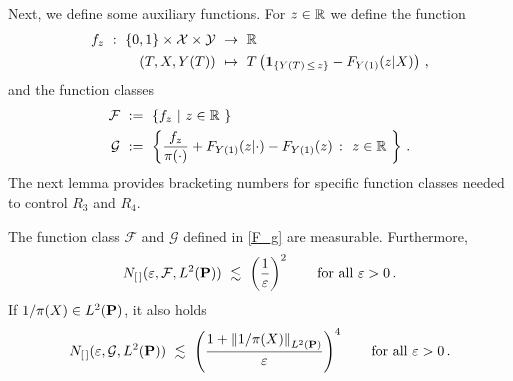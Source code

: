 Next, we define some auxiliary functions.
  For $z\in\R$ we define the function
  \begin{align*}
    f_z
    \ 
    :
    \ 
      \left\{ 0,1 \right\}
      \times
      \mathcal{X}
      \times
      \mathcal{Y}
    &
    \ 
    \to
    \ 
    \R
    \\
      (T,X,Y(T))
    &
      \ 
      \mapsto
      \ 
      T
      \left( 
        \mathbf{1}
        _{\left\{  Y(T)\,\le\,z \right\}}
        -
        F_{Y(1)}(z|X)
      \right)
      \,,
  \end{align*}
  and the function classes
  \begin{gather}
    \label{F_g}
    \begin{split}
    \mathcal{F}
    &
    \ 
    :=
    \ 
    \left\{ 
      f_z
      \ 
      |
      \ 
      z\in\R\ 
    \right\}
    \\
    \mathcal{G}
    &
    \ 
    :=
    \ 
    \left\{ 
      \frac{f_z}{\pi(\cdot)}
      +
      F_{Y(1)}(z|\cdot)
      -
      F_{Y(1)}(z)
      \ 
      \colon
      \ 
      z\in\R\ 
    \right\}
    \,.
    \end{split}
  \end{gather}
The next lemma provides bracketing numbers for specific function classes needed to control $R_3$ and $R_4$.
\newpage
\begin{lemma}
  The function class $\mathcal{F}$ and $\mathcal{G}$ defined in \eqref{F_g} are measurable.
  Furthermore, 
  \begin{gather*}
    N_{[\,]}
    (
    \varepsilon
    ,
    \mathcal{F}, L^2(\P))
    \ 
    \lesssim
    \ 
    \left( 
      \frac{1}{\varepsilon}
    \right)^2
    \qquad
    \text{for all}
    \ 
    \varepsilon>0
    \,.
  \end{gather*}
  If $1/\pi(X)\in L^2(\P)$, it also holds 
  \begin{gather*}
    N_{[\,]}
    (
    \varepsilon
    ,
    \mathcal{G}, L^2(\P))
    \ 
    \lesssim
    \ 
    \left( 
    \frac{
      1+
    \norm{1/\pi(X)}_{ L^2(\P)}
    }
    {\varepsilon}
    \right)^4
    \qquad
    \text{for all}
    \ 
    \varepsilon>0
    \,.
  \end{gather*}
\end{lemma}
